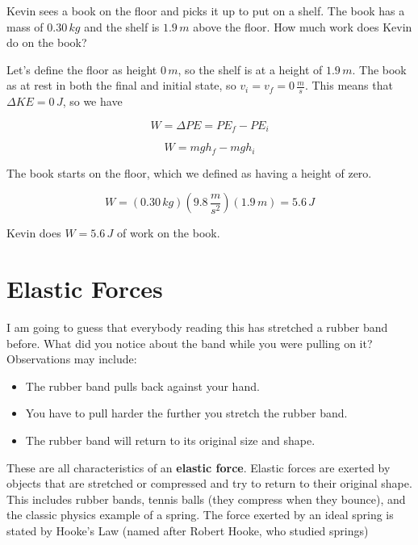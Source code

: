 \documentclass[12pt]{book}
\begin{document}
\begin{exampleblock}

Kevin sees a book on the floor and picks it up to put on a shelf. The book has a mass of $0.30 \, kg$ and the shelf is $1.9 \, m$ above the floor. How much work does Kevin do on the book?

\hspace{10pt}

Let's define the floor as height $0 \, m$, so the shelf is at a height of $1.9 \, m$. The book as at rest in both the final and initial state, so $v_i = v_f = 0 \, \frac{m}{s}$. This means that $\Delta KE = 0 \, J$, so we have

\begin{equation}
W = \Delta PE = PE_f - PE_i
\end{equation}

\begin{equation}
W = mgh_f - mgh_i
\end{equation}

The book starts on the floor, which we defined as having a height of zero.

\begin{equation}
W = (0.30 \, kg) (9.8 \, \frac{m}{s^2}) (1.9 \, m) = 5.6 \, J
\end{equation}

Kevin does $W = 5.6 \, J$ of work on the book.

\end{exampleblock}

\section{Elastic Forces}

I am going to guess that everybody reading this has stretched a rubber band before. What did you notice about the band while you were pulling on it? Observations may include:

\begin{itemize}
\item The rubber band pulls back against your hand.
\item You have to pull harder the further you stretch the rubber band.
\item The rubber band will return to its original size and shape.
\end{itemize}

These are all characteristics of an \textbf{elastic force}. Elastic forces are exerted by objects that are stretched or compressed and try to return to their original shape. This includes rubber bands, tennis balls (they compress when they bounce), and the classic physics example of a spring. The force exerted by an ideal spring is stated by Hooke's Law (named after Robert Hooke, who studied springs)
\end{document}
